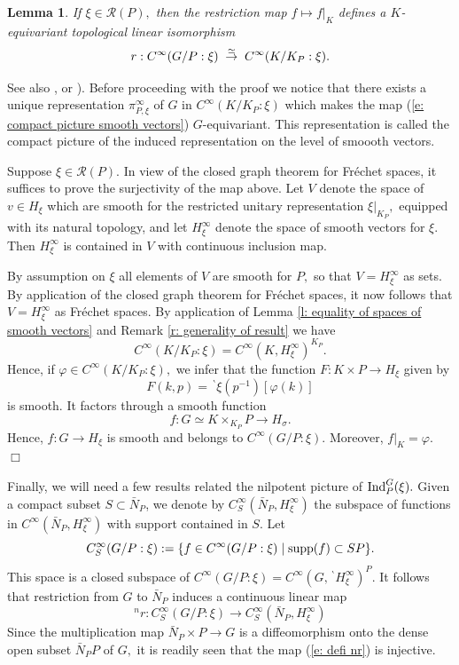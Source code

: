 \documentclass[12pt,a4paper]{article}
\newtheorem{Lemma}[Thm]{Lemma}
\newenvironment{lemma}[0]{\begin{Lemma}\noindent}%
{\end{Lemma}}
\def\proof{\par\noindent{\it Proof.}{\ }{\ }}
\def\qed{~\hfill\hbox{$\Box$}\medbreak}
\def\medno{\medbreak\noindent}
\def\gf{\varphi}
\def\gs{\sigma}
\def\to{\rightarrow}
\def\cR{{\mathcal R}}
\numberwithin{Thm}{section}
\numberwithin{equation}{section}
\def\Ind{{\rm Ind}}
\def\supp{{\rm supp}}
\numberwithin{equation}{section}
\def\bp{\!{\,}^\backprime}
\begin{document}
\begin{lemma}
\label{l: restriction of smooth vectors and the compact picture}
If $\xi \in \cR(P),$  then
the restriction map $ f \mapsto f|_K$ defines a $K$-equivariant 
topological linear isomorphism
\begin{equation}
\label{e: compact picture smooth vectors} 
r: C^\infty (G/ P:\xi) \;\; {\buildrel \simeq \over \to} \;\; C^\infty(K/K_P:\xi).
\end{equation}
\end{lemma} 
See also \cite[\S 10.1.1]{Wrrg2}, or \cite[Cor. III.7.9]{BWcc}).
\medno
Before proceeding with the proof we notice that there exists a unique representation $\pi_{P,\xi}^\infty$ 
of $G$ in $C^\infty(K/K_P:\xi)$ which makes the map (\ref{e: compact picture smooth vectors})
$G$-equivariant.
This representation is called the compact picture of the induced representation on the level
of smoooth vectors.
\medbreak

\proof
Suppose $\xi \in \cR(P).$ 
In view of the closed graph theorem for Fr\'echet spaces, it suffices
to prove the surjectivity of the map above. 
Let $V$ denote the space of $v \in H_\xi$ which are smooth for the restricted
unitary representation $\xi|_{K_P},$ equipped with its natural topology,
and let $H_\xi^\infty$ denote the space of smooth vectors for $\xi.$ 
Then $H_\xi^\infty$ is contained in $V$ with continuous inclusion 
map. 

By assumption on $\xi$ all elements of $V$ are smooth for $P,$ so that
$V = H_\xi^\infty$ as sets.
By application of the closed graph theorem for Fr\'echet spaces, it now follows
that $V = H_\xi^\infty$ as Fr\'echet spaces. By application
of Lemma \ref{l: equality of spaces of smooth vectors} and Remark \ref{r: generality of result}
we have 
$$ 
C^\infty(K/K_P:\xi) = C^\infty(K , H_\xi^\infty)^{K_P}.
$$%
Hence, if  $\gf \in C^\infty(K/K_P:\xi),$ we infer that 
the function $F: K \times P \to H_\xi $ 
given by 
$$ 
F(k, p) = \bp\xi(p^{-1}) [\gf(k)] 
$$%
is smooth. It factors through a smooth function 
$$ 
f: G \simeq K\times_{K_P} P \to H_\gs.
$$%
Hence, $f: G \to H_\xi$ is smooth and belongs to $C^\infty(G/P:\xi).$ 
Moreover, $f|_K = \gf.$ 
\qed

Finally, we will need a few results related the nilpotent picture of $\Ind_P^G(\xi).$ 
Given a compact subset $S \subset \bar N_P$, we denote
by $C_S^\infty(\bar N_P, H_\xi^\infty)$ the subspace of functions in  $C^\infty(\bar N_P, H_\xi^\infty)$ 
with support contained in $S.$ Let  
$$
C_S^\infty(G/P : \xi): = \{ f\in C^\infty(G/ P : \xi)\mid \supp(f) \subset S P\}.
$$ 
This space is a closed subspace of $C^\infty(G/ P : \xi) = C^\infty(G, \bp H_\xi^\infty)^P.$ 
It follows that restriction from $G$ to $\bar N_P$ induces a continuous linear map
\begin{equation}
\label{e: defi nr}
{}^n r: C_S^\infty(G/P : \xi) \to C_S^\infty(\bar N_P, H_\xi^\infty)
\end{equation}
Since the multiplication map $\bar N_P \times P \to G$ is a diffeomorphism
onto the dense open subset $\bar N_P P$ of $G,$ 
it is readily seen that  the map (\ref{e: defi nr}) is injective. 
\end{document}
